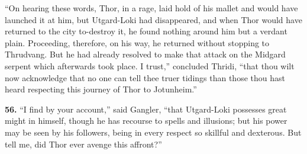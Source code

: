 ``On hearing these words, Thor, in a rage, laid hold of his mallet and
would have launched it at him, but Utgard-Loki had disappeared, and
when Thor would have returned to the city to-destroy it, he found
nothing around him but a verdant plain. Proceeding, therefore, on his
way, he returned without stopping to Thrudvang. But he had already
resolved to make that attack on the Midgard serpent which afterwards
took place. I trust,'' concluded Thridi, ``that thou wilt now
acknowledge that no one can tell thee truer tidings than those thou
hast heard respecting this journey of Thor to Jotunheim.''


\textbf{56.} ``I find by your account,'' said Gangler, ``that Utgard-Loki
possesses great might in himself, though he has recourse to spells and
illusions; but his power may be seen by his followers, being in every
respect so skillful and dexterous. But tell me, did Thor ever avenge
this affront?''

